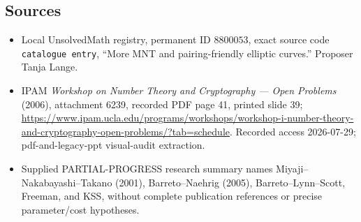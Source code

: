 \documentclass[11pt]{article}
\begin{document}
\subsection{Sources}
\begin{itemize}
\item Local UnsolvedMath registry, permanent ID \(8800053\), exact source code \texttt{catalogue entry}, ``More MNT and pairing-friendly elliptic curves.'' Proposer Tanja Lange.
\item IPAM \emph{Workshop on Number Theory and Cryptography --- Open Problems} (2006), attachment 6239, recorded PDF page 41, printed slide 39; \url{https://www.ipam.ucla.edu/programs/workshops/workshop-i-number-theory-and-cryptography-open-problems/?tab=schedule}. Recorded access 2026-07-29; pdf-and-legacy-ppt visual-audit extraction.
\item Supplied PARTIAL-PROGRESS research summary names Miyaji--Nakabayashi--Takano (2001), Barreto--Naehrig (2005), Barreto--Lynn--Scott, Freeman, and KSS, without complete publication references or precise parameter/cost hypotheses.
\end{itemize}
\end{document}
